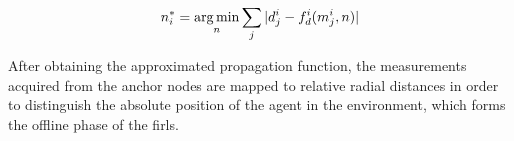     \begin{equation}
      n^*_i = \operatorname*{arg\,min}_n \sum_j |d^i_j - f^i_d(m^i_j, n)|
    \end{equation}

    After obtaining the approximated propagation function, the measurements acquired from the anchor nodes are mapped to relative radial distances in order to distinguish the absolute position of the agent in the environment, which forms the offline phase of the \gls{firl}s.
